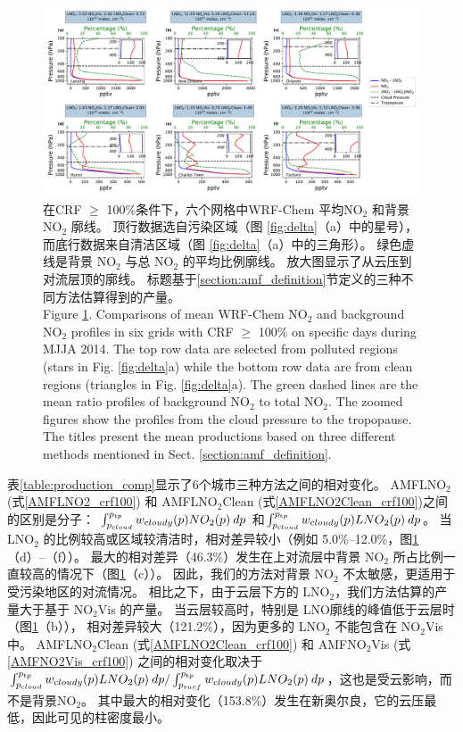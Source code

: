 \begin{figure}[h]
\includegraphics[width=18cm]{./figures/bkgd_comp.pdf}
\caption{在CRF $\geq$ 100\%条件下，六个网格中WRF-Chem 平均NO$_\textrm{2}$ 和背景 NO$_\textrm{2}$ 廓线。
顶行数据选自污染区域（图 \ref{fig:delta}（a）中的星号），而底行数据来自清洁区域（图 \ref{fig:delta}（a）中的三角形）。
绿色虚线是背景 NO$_\textrm{2}$ 与总 NO$_\textrm{2}$ 的平均比例廓线。
放大图显示了从云压到对流层顶的廓线。
标题基于\ref{section:amf_definition}节定义的三种不同方法估算得到的产量。\\
Figure \ref{fig:bkgd_comp}. Comparisons of mean WRF-Chem NO$_\textrm{2}$ and background NO$_\textrm{2}$ profiles in six grids with CRF $\geq$ 100\% on specific days during MJJA 2014.
The top row data are selected from polluted regions (stars in Fig. \ref{fig:delta}a) while the bottom row data are from clean regions (triangles in Fig. \ref{fig:delta}a).
The green dashed lines are the mean ratio profiles of background NO$_\textrm{2}$ to total NO$_\textrm{2}$.
The zoomed figures show the profiles from the cloud pressure to the tropopause.
The titles present the mean productions based on three different methods mentioned in Sect. \ref{section:amf_definition}.}
\label{fig:bkgd_comp}
\end{figure}


表\ref{table:production_comp}显示了6个城市三种方法之间的相对变化。
AMFLNO$_2$ (式\ref{AMFLNO2_crf100}) 和 AMFLNO$_2$Clean (式\ref{AMFLNO2Clean_crf100})之间的区别是分子：
$\int_{p_{\textrm cloud}}^{p_{\textrm tp}} w_{\textrm cloudy}(p) NO_2(p) \: dp$
和$\int_{p_{\textrm cloud}}^{p_{\textrm tp}} w_{\textrm cloudy}(p) LNO_2(p) \: dp$。
当 LNO$_2$ 的比例较高或区域较清洁时，相对差异较小（例如 5.0\%--12.0\%，图\ref{fig:bkgd_comp}（d）--（f））。
最大的相对差异（46.3\%）发生在上对流层中背景 NO$_2$ 所占比例一直较高的情况下（图\ref{fig:bkgd_comp}（c））。
因此，我们的方法对背景 NO$_2$ 不太敏感，更适用于受污染地区的对流情况。
相比之下，由于云层下方的 LNO$_2$，我们方法估算的产量大于基于 NO$_2$Vis 的产量。
当云层较高时，特别是 LNO廓线的峰值低于云层时（图\ref{fig:bkgd_comp}（b）），
相对差异较大（121.2\%），因为更多的 LNO$_2$ 不能包含在 NO$_2$Vis 中。
AMFLNO$_2$Clean (式\ref{AMFLNO2Clean_crf100}) 和 AMFNO$_2$Vis (式\ref{AMFNO2Vis_crf100}) 之间的相对变化取决于
$\int_{p_{\textrm cloud}}^{p_{\textrm tp}} w_{\textrm cloudy}(p) LNO_2(p) \: dp / \int_{p_{\textrm surf}}^{p_{\textrm tp}} w_{\textrm cloudy}(p) LNO_2(p) \: dp$，这也是受云影响，而不是背景NO$_2$。
其中最大的相对变化（153.8\%）发生在新奥尔良，它的云压最低，因此可见的柱密度最小。


